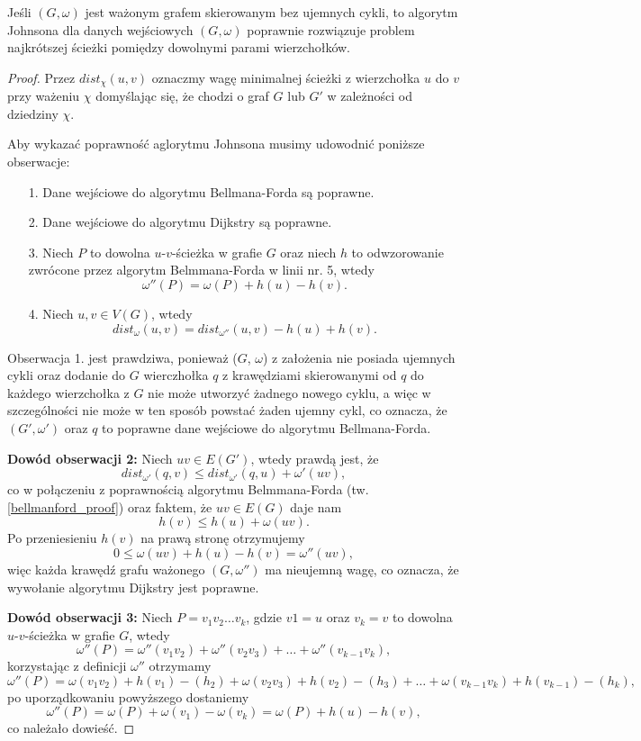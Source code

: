 \begin{theorem}
	Jeśli $(G, \omega)$ jest ważonym grafem skierowanym
	bez ujemnych cykli, to algorytm Johnsona dla 
	danych wejściowych $(G, \omega)$ poprawnie
	rozwiązuje problem najkrótszej ścieżki 
	pomiędzy dowolnymi parami wierzchołków.
	
	\begin{proof}
		Przez $dist_\chi(u, v)$ oznaczmy wagę minimalnej ścieżki
		z wierzchołka $u$ do $v$ przy ważeniu $\chi$ domyślając się, 
		że chodzi o graf $G$ lub $G'$ w zależności od dziedziny $\chi$.
		
		Aby wykazać poprawność aglorytmu Johnsona 
		musimy udowodnić poniższe obserwacje:
		\begin{itemize}
			\item[1. ] Dane wejściowe do 
			algorytmu Bellmana-Forda są poprawne.
			\item[2. ] Dane wejściowe do 
			algorytmu Dijkstry są poprawne.
			\item[3. ] Niech $P$ to dowolna
			$u$-$v$-ścieżka w grafie $G$ oraz niech $h$
			to odwzorowanie zwrócone przez algorytm
			Belmmana-Forda w linii nr. 5, wtedy
			\[\omega''(P) = \omega(P) +  h(u) - h(v).\]
			\item[4. ] Niech $u, v \in V(G)$, wtedy
			\[dist_{\omega}(u, v) = dist_{\omega''}(u, v) - h(u) + h(v).\]
		\end{itemize}
		
		Obserwacja 1. jest prawdziwa, ponieważ ($G$, $\omega$)
		z założenia nie posiada ujemnych cykli oraz
		dodanie do $G$ wierczhołka $q$ z krawędziami skierowanymi
		od $q$ do każdego wierzchołka z $G$ nie może utworzyć
		żadnego nowego cyklu, a więc w szczególności nie może
		w ten sposób powstać żaden ujemny cykl, co oznacza, że
		$(G', \omega')$ oraz $q$ to poprawne dane wejściowe
		do algorytmu Bellmana-Forda.
		
		\textbf{Dowód obserwacji 2:} Niech $uv \in E(G')$, 
		wtedy prawdą jest, że
		\[dist_{\omega'}(q, v) \leq dist_{\omega'}(q, u) + \omega'(uv),\]
		co w połączeniu z poprawnością algorytmu Belmmana-Forda (tw.
		\ref{bellmanford_proof}) oraz faktem, że 
		$uv \in E(G)$ daje nam
		\[h(v) \leq h(u) + \omega(uv).\]
		Po przeniesieniu $h(v)$ na prawą stronę otrzymujemy 
		\[0 \leq \omega(uv) + h(u) - h(v) = \omega''(uv),\]
		więc każda krawędź grafu ważonego $(G, \omega'')$ ma
		nieujemną wagę, co oznacza, że wywołanie algorytmu 
		Dijkstry jest poprawne.  
		
		\textbf{Dowód obserwacji 3:} Niech $P=v_1v_2\dots v_k$, 
		gdzie $v1 = u$ oraz $v_k = v$ to dowolna $u$-$v$-ścieżka
		w grafie $G$, wtedy 
		\[\omega''(P) = \omega''(v_1v_2) + \omega''(v_2v_3) + \dots + \omega''(v_{k-1}v_k),\]
		korzystając z definicji $\omega''$ otrzymamy
		\[\omega''(P) = \omega(v_1v_2) + h(v_1) - (h_2) + 
		\omega(v_2v_3) + h(v_2) - (h_3) + 
		\dots + \omega(v_{k-1}v_k) + h(v_{k-1}) - (h_k),\]
		po uporządkowaniu powyższego dostaniemy
		\[\omega''(P) = \omega(P) + \omega(v_1) - \omega(v_k) = \omega(P) + h(u) - h(v),\]
		co należało dowieść.
		

\end{proof}
\end{theorem}
